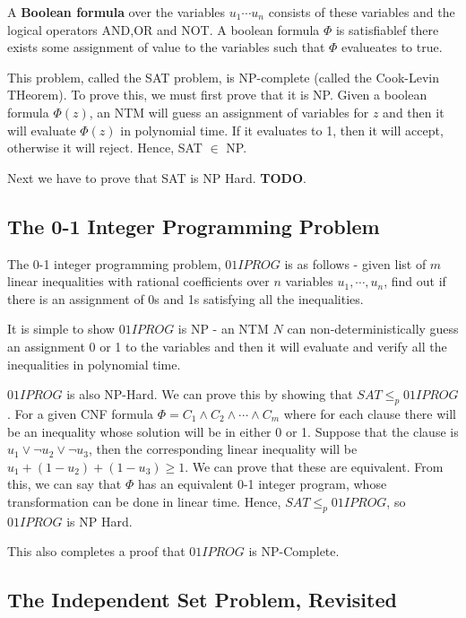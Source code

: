 \documentclass[12pt,letterpaper]{article}
\theoremstyle{definition}
\begin{document}
A \textbf{Boolean formula}  over the variables $u_1 \cdots u_n$ consists of these variables and the logical operators AND,OR and NOT. A boolean formula $\Phi$ is satisfiablef there exists some assignment of value to the variables such that $\Phi$ evalueates to true.

This problem, called the SAT problem, is NP-complete (called the Cook-Levin THeorem). To prove this, we must first prove that it is NP. Given a boolean formula $\Phi(z)$, an NTM will guess an assignment of variables for $z$ and then it will evaluate $\Phi(z)$ in polynomial time. If it evaluates to 1, then it will accept, otherwise it will reject. Hence, SAT $\in$ NP.

Next we have to prove that SAT is NP Hard. \textbf{TODO}.


\subsection{The 0-1 Integer Programming Problem}

The 0-1 integer programming problem, $01IPROG$ is as follows - given  list of $m$ linear inequalities with rational coefficients over $n$ variables $u_1, \cdots, u_n$, find out if there is an assignment of 0s and 1s satisfying all the inequalities.

It is simple to show $01IPROG$ is NP - an NTM $N$ can non-deterministically guess an assignment 0 or 1 to the variables and then it will evaluate and verify all the inequalities in polynomial time.

$01IPROG$ is also NP-Hard. We can prove this by showing that $SAT \leq_p 01IPROG$. For a given CNF formula $\Phi = C_1 \land C_2 \land \cdots \land C_m$ where for each clause there will be an inequality whose solution will be in either 0 or 1. Suppose that the clause is $u_1 \lor \lnot u_2 \lor \lnot u_3$, then the corresponding linear inequality will be $u_1 + (1 - u_2) + (1-u_3) \geq 1$. We can prove that these are equivalent. From this, we can say that $\Phi$ has an equivalent 0-1 integer program, whose transformation can be done in linear time. Hence, $SAT \leq_p 01IPROG$, so $01IPROG$ is NP Hard.

This also completes a proof that $01IPROG$ is NP-Complete.

\subsection{The Independent Set Problem, Revisited}
\end{document}
